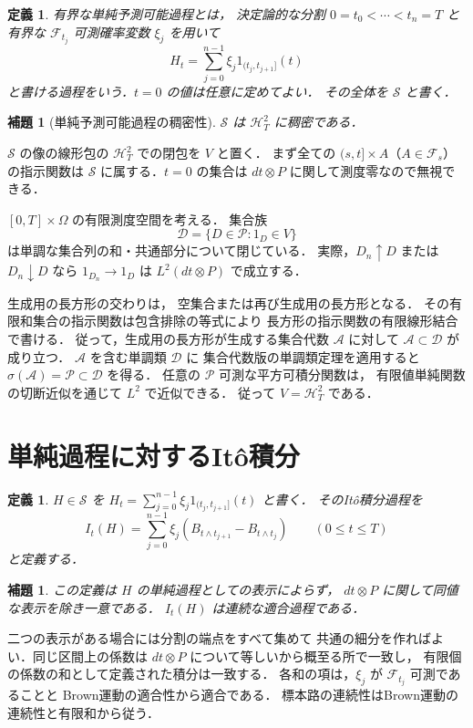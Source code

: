 \documentclass[a5paper,10pt,onecolumn]{jsarticle}
\makeatletter
\theoremstyle{mathnotetheorem}
\newtheorem{definition}[theorem]{定義}
\newtheorem{lemma}[theorem]{補題}
\renewcommand{\proofname}{証明}
\renewenvironment{proof}[1][\proofname]{%
  \par\pushQED{\qed}\normalfont\topsep4\p@\@plus2\p@\relax
  \trivlist\item[\hskip\labelsep\bfseries #1]\ignorespaces
}{\popQED\endtrivlist\@endpefalse}
\makeatother
\begin{document}
\begin{definition}
有界な\emph{単純予測可能過程}とは，
決定論的な分割 $0=t_0<\cdots<t_n=T$ と
有界な $\mathcal F_{t_j}$ 可測確率変数 $\xi_j$
を用いて
\[
 H_t=\sum_{j=0}^{n-1}\xi_j1_{(t_j,t_{j+1}]}(t)
\]
と書ける過程をいう．$t=0$ の値は任意に定めてよい．
その全体を $\mathcal S$ と書く．
\end{definition}

\begin{lemma}[単純予測可能過程の稠密性]\label{lem:density}
$\mathcal S$ は $\mathcal H^2_T$ に稠密である．
\end{lemma}
\begin{proof}
$\mathcal S$ の像の線形包の
$\mathcal H^2_T$ での閉包を $V$ と置く．
まず全ての
$(s,t]\times A$（$A\in\mathcal F_s$）の指示関数は
$\mathcal S$ に属する．$t=0$ の集合は
$dt\otimes P$ に関して測度零なので無視できる．

$[0,T]\times\Omega$ の有限測度空間を考える．
集合族
\[
 \mathcal D=\{D\in\mathcal P:1_D\in V\}
\]
は単調な集合列の和・共通部分について閉じている．
実際，$D_n\uparrow D$ または $D_n\downarrow D$ なら
$1_{D_n}\to1_D$ は $L^2(dt\otimes P)$ で成立する．

生成用の長方形の交わりは，
空集合または再び生成用の長方形となる．
その有限和集合の指示関数は包含排除の等式により
長方形の指示関数の有限線形結合で書ける．
従って，生成用の長方形が生成する集合代数
$\mathcal A$ に対して $\mathcal A\subset\mathcal D$ が成り立つ．
$\mathcal A$ を含む単調類 $\mathcal D$ に
集合代数版の単調類定理を適用すると
$\sigma(\mathcal A)=\mathcal P\subset\mathcal D$ を得る．
任意の $\mathcal P$ 可測な平方可積分関数は，
有限値単純関数の切断近似を通じて $L^2$ で近似できる．
従って $V=\mathcal H^2_T$ である．
\end{proof}

\section{単純過程に対するIt\^o積分}

\begin{definition}
$H\in\mathcal S$ を
$H_t=\sum_{j=0}^{n-1}\xi_j1_{(t_j,t_{j+1}]}(t)$ と書く．
その\emph{It\^o積分過程}を
\[
 I_t(H)=\sum_{j=0}^{n-1}
 \xi_j(B_{t\wedge t_{j+1}}-B_{t\wedge t_j})
 \qquad(0\le t\le T)
\]
と定義する．
\end{definition}

\begin{lemma}\label{lem:simple-well}
この定義は $H$ の単純過程としての表示によらず，
$dt\otimes P$ に関して同値な表示を除き一意である．
$I_t(H)$ は連続な適合過程である．
\end{lemma}
\begin{proof}
二つの表示がある場合には分割の端点をすべて集めて
共通の細分を作ればよい．同じ区間上の係数は
$dt\otimes P$ について等しいから概至る所で一致し，
有限個の係数の和として定義された積分は一致する．
各和の項は，$\xi_j$ が $\mathcal F_{t_j}$ 可測であることと
Brown運動の適合性から適合である．
標本路の連続性はBrown運動の連続性と有限和から従う．
\end{proof}
\end{document}
